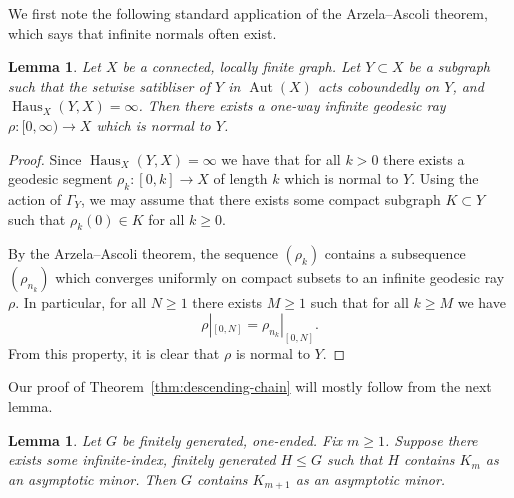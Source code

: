 \documentclass[10pt,a4paper]{amsart}
\DeclareMathOperator{\dHaus}{Haus}
\DeclareMathOperator{\Aut}{Aut}
\newtheorem{lemma}[theorem]{Lemma}
\theoremstyle{definition}
\begin{document}
We first note the following standard application of the Arzela--Ascoli theorem, which says that infinite normals often exist.

\begin{lemma}\label{lem:normal-ray-subgroup}
    Let $X$ be a connected, locally finite graph. Let $Y \subset X$ be a subgraph such that the setwise satibliser of $Y$ in $ \Aut(X)$ acts coboundedly on $Y$, and $\dHaus_X(Y, X) = \infty$. Then there exists a one-way infinite geodesic ray $\rho : [0,\infty) \to X$ which is normal to $Y$. 
\end{lemma}

\begin{proof}
    Since $\dHaus_X(Y, X) = \infty$ we have that for all $k > 0$ there exists a geodesic segment $\rho_k : [0,k] \to X$ of length $k$ which is normal to $Y$. Using the action of $\Gamma_Y$, we may assume that there exists some compact subgraph $K \subset Y$ such that $\rho_k(0) \in K$ for all $k \geq 0$. 

    By the Arzela--Ascoli theorem, the sequence $(\rho_k)$ contains a subsequence $(\rho_{n_k})$ which converges uniformly on compact subsets to an infinite geodesic ray $\rho$. 
    In particular, for all $N \geq 1$ there exists $M \geq 1$ such that for all $k \geq M$ we have 
    $$
    \rho|_{[0,N]} = \rho_{n_k}|_{[0,N]}.
    $$ 
    From this property, it is clear that $\rho$ is normal to $Y$.
\end{proof}

Our proof of Theorem~\ref{thm:descending-chain} will mostly follow from the next lemma.

\begin{lemma}\label{lem:induct}
    Let $G$ be finitely generated, one-ended. 
    Fix $m \geq 1$. Suppose there exists some infinite-index, finitely generated $H \leq G$ such that $H$ contains $K_m$ as an asymptotic minor. 
    Then $G$ contains $K_{m+1}$ as an asymptotic minor. 
\end{lemma}
\end{document}
